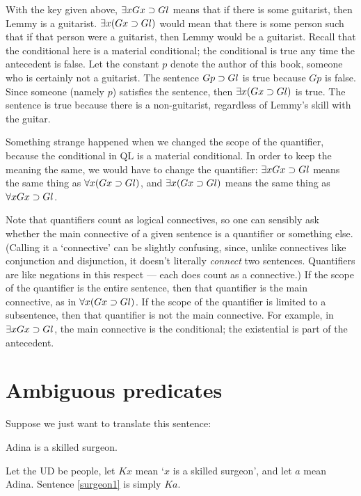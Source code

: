 With the key given above, $\exists x Gx \supset Gl$ means that if there is some guitarist, then Lemmy is a guitarist. $\exists x (Gx \supset Gl)$ would mean that there is some person such that if that person were a guitarist, then Lemmy would be a guitarist. Recall that the conditional here is a material conditional; the conditional is true any time the antecedent is false. Let the constant $p$ denote the author of this book, someone who is certainly not a guitarist. The sentence $Gp \supset Gl$ is true because $Gp$ is false. Since someone (namely $p$) satisfies the sentence, then $\exists x (Gx \supset Gl)$ is true. The sentence is true because there is a non-guitarist, regardless of Lemmy's skill with the guitar.

Something strange happened when we changed the scope of the quantifier, because the conditional in QL is a material conditional. In order to keep the meaning the same, we would have to change the quantifier: $\exists x Gx \supset Gl$ means the same thing as $\forall x (Gx \supset Gl)$, and $\exists x (Gx \supset Gl)$ means the same thing as $\forall x Gx \supset Gl$.


Note that quantifiers count as logical connectives, so one can sensibly ask whether the main connective of a given sentence is a quantifier or something else. (Calling it a `connective' can be slightly confusing, since, unlike connectives like conjunction and disjunction, it doesn't literally \emph{connect} two sentences. Quantifiers are like negations in this respect --- each does count as a connective.) If the scope of the quantifier is the entire sentence, then that quantifier is the main connective, as in $\forall x (Gx \supset Gl)$. If the scope of the quantifier is limited to a subsentence, then that quantifier is not the main connective. For example, in $\exists x Gx \supset Gl$, the main connective is the conditional; the existential is part of the antecedent.

\section{Ambiguous predicates}

Suppose we just want to translate this sentence:
\begin{earg}
\item[\ex{surgeon1}] Adina is a skilled surgeon.
\end{earg}
Let the UD be people, let $Kx$ mean `$x$ is a skilled surgeon', and let $a$ mean Adina. Sentence \ref{surgeon1} is simply $Ka$.


